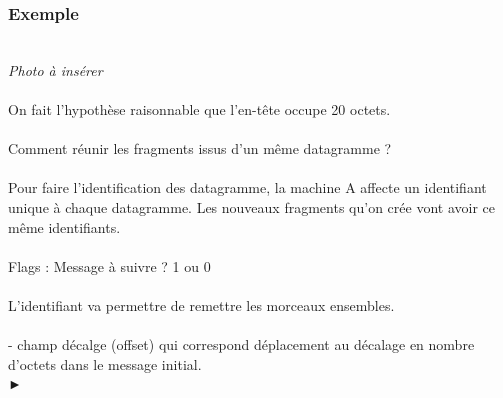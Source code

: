 \documentclass{article}
\begin{document}
\subsubsection*{Exemple} \\
\emph{Photo à insérer} \\ 
\\
On fait l'hypothèse raisonnable que l'en-tête occupe 20 octets. \\ 
\\
Comment réunir les fragments issus d'un même datagramme ? \\
\\
Pour faire l’identification des datagramme, la machine A affecte un identifiant unique à chaque datagramme. 
Les nouveaux fragments  qu’on crée vont avoir ce même identifiants. \\
\\
Flags : Message à suivre ? 1 ou 0 \\
\\
\newpage
L'identifiant va permettre de remettre les morceaux ensembles. \\
\\ 
- champ décalge (offset) qui correspond déplacement au décalage en nombre d'octets dans le message initial.\\►
\end{document}

